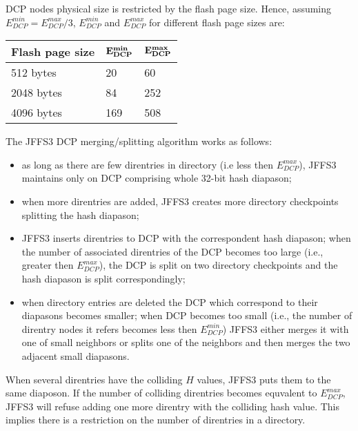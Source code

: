 \documentclass[12pt,a4paper,oneside,titlepage]{article}
\begin{document}
DCP nodes physical size is restricted by the flash page size. Hence,
assuming $E_{DCP}^{min} = E_{DCP}^{max}/3$,
$E_{DCP}^{min}$ and $E_{DCP}^{max}$ for different flash page sizes are:

\begin{center}
\begin{tabular}{lll}
\textbf{Flash page size} & $\bf E_{DCP}^{min}$ & $\bf E_{DCP}^{max}$\\
\hline
512 bytes  & 20  & 60\\
2048 bytes & 84  & 252\\
4096 bytes & 169 & 508\\
\end{tabular}
\end{center}

The JFFS3 DCP merging/splitting algorithm works as follows:
\begin{itemize}
\item as long as there are few direntries in directory (i.e less then
$E_{DCP}^{max}$), JFFS3 maintains only on DCP comprising whole
\mbox{32-bit} hash diapason;

\item when more direntries are added, JFFS3 creates more directory
checkpoints splitting the hash diapason;

\item JFFS3 inserts direntries to DCP with the correspondent hash
diapason; when the number of associated direntries of the DCP becomes
too large (i.e., greater then $E_{DCP}^{max}$), the DCP is split on two
directory checkpoints and the hash diapason is split correspondingly;

\item when directory entries are deleted the DCP which correspond to
their diapasons becomes smaller; when DCP becomes too small (i.e., the
number of direntry nodes it refers becomes less then $E_{DCP}^{min}$)
JFFS3 either merges it with one of small neighbors or splits one of the
neighbors and then merges the two adjacent small diapasons.
\end{itemize}

When several direntries have the colliding $H$ values, JFFS3 puts them
to the same diaposon. If the number of colliding direntries becomes
equvalent to $E_{DCP}^{max}$, JFFS3 will refuse adding one more direntry
with the colliding hash value. This implies there is a restriction on the number
of direntries in a directory.

%
%
\end{document}
